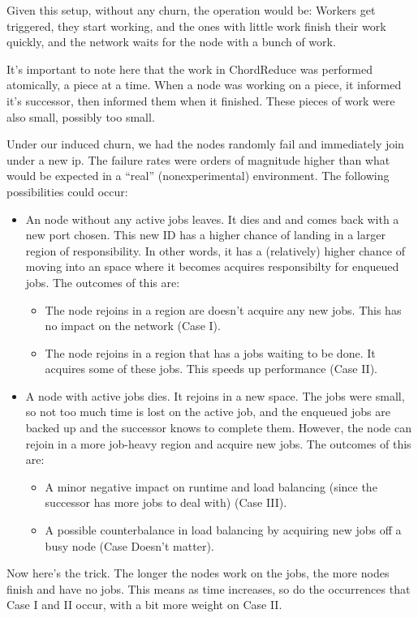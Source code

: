 Given this setup, without any churn, the operation would be:
Workers get triggered, they start working, and the ones with little work finish their work quickly, and the network waits for the node with a bunch of work.

It's important to note here that the work in ChordReduce was performed atomically, a piece at a time.
When a node was working on a piece, it informed it's successor, then informed them when it finished.
These pieces of work were also small, possibly too small.

Under our induced churn, we had the nodes randomly fail and  immediately join under a new ip.
The failure rates were orders of magnitude higher than what would be expected in a ``real'' (nonexperimental) environment.
The following possibilities could occur:
\begin{itemize}
	\item An node without any active jobs leaves.
	It dies and and comes back with a new port chosen.
	This new ID has a higher chance of landing in a larger region of responsibility.
	In other words, it has a (relatively) higher chance of moving into an space where it becomes acquires responsibilty for enqueued jobs.
	The outcomes of this are:
	\begin{itemize}
		\item The node rejoins in a region are doesn't acquire any new jobs.
		This has no impact on the network (Case I).
		\item The node rejoins in a region that has a jobs waiting to be done.
		It acquires some of these jobs.
		This speeds up performance (Case II).
	\end{itemize}
	\item A node with active jobs dies.
	It rejoins in a new space.
	The jobs were small, so not too much time is lost on the active job, and the enqueued jobs are backed up and the successor knows to complete them.
	However, the node can rejoin in a more job-heavy region and acquire new jobs.
	The outcomes of this are:
	\begin{itemize}
		\item A minor negative impact on runtime and load balancing (since the successor has more jobs to deal with) (Case III).
		\item A possible counterbalance in load balancing by acquiring new jobs off a busy node (Case Doesn't matter).
	\end{itemize}
\end{itemize}

Now here's the trick.
The longer the nodes work on the jobs, the more nodes finish and have no jobs.
This means as time increases, so do the occurrences that Case I and II occur, with a bit more weight on Case II.


